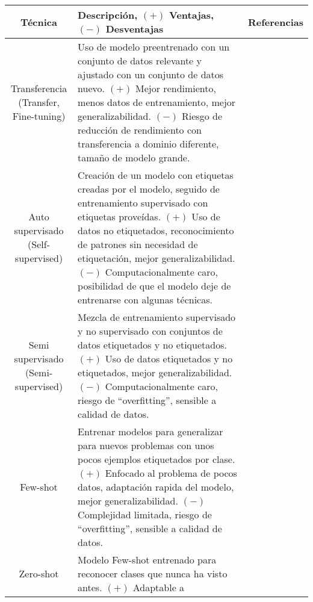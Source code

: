 \begin{center}
    \begin{table}[h!]
        \footnotesize
        \begin{tabular}{ |c|m{9.5cm}|c| }
            \hline
            \bf Técnica & \bf Descripción, $(+)$ Ventajas, $(-)$ Desventajas & \bf Referencias \\
            \hline
            \makecell{Transferencia \\ (Transfer, Fine-tuning)} & Uso de modelo preentrenado con un conjunto de datos
            relevante y ajustado con un conjunto de datos nuevo. $(+)$ Mejor rendimiento, menos datos de entrenamiento,
            mejor generalizabilidad. $(-)$ Riesgo de reducción de rendimiento con transferencia a dominio diferente,
            tamaño de modelo grande. & \makecell{\autocite{safonova-2023,maggiori-2016-0,castelluccio-2015} \\
            \autocite{nogueira-2017,zhong-2016,amato-2023}} \\
            \hline
            \makecell{Auto supervisado \\ (Self-supervised)} & Creación de un modelo con etiquetas creadas por el
            modelo, seguido de entrenamiento supervisado con etiquetas proveídas. $(+)$ Uso de datos no etiquetados,
            reconocimiento de patrones sin necesidad de etiquetación, mejor generalizabilidad. $(-)$ Computacionalmente
            caro, posibilidad de que el modelo deje de entrenarse con algunas técnicas. & \autocite{safonova-2023} \\
            \hline
            \makecell{Semi supervisado \\ (Semi-supervised)} & Mezcla de entrenamiento supervisado y no supervisado con
            conjuntos de datos etiquetados y no etiquetados. $(+)$ Uso de datos etiquetados y no etiquetados, mejor
            generalizabilidad. $(-)$ Computacionalmente caro, riesgo de \enquote{overfitting}, sensible a calidad de
            datos. & \autocite{safonova-2023} \\
            \hline
            Few-shot & Entrenar modelos para generalizar para nuevos problemas con unos pocos ejemplos etiquetados por
            clase. $(+)$ Enfocado al problema de pocos datos, adaptación rapida del modelo, mejor generalizabilidad.
            $(-)$ Complejidad limitada, riesgo de \enquote{overfitting}, sensible a calidad de datos. &
            \autocite{safonova-2023} \\
            \hline
            Zero-shot & Modelo Few-shot entrenado para reconocer clases que nunca ha visto antes. $(+)$ Adaptable a

\end{tabular}
\end{table}
\end{center}
